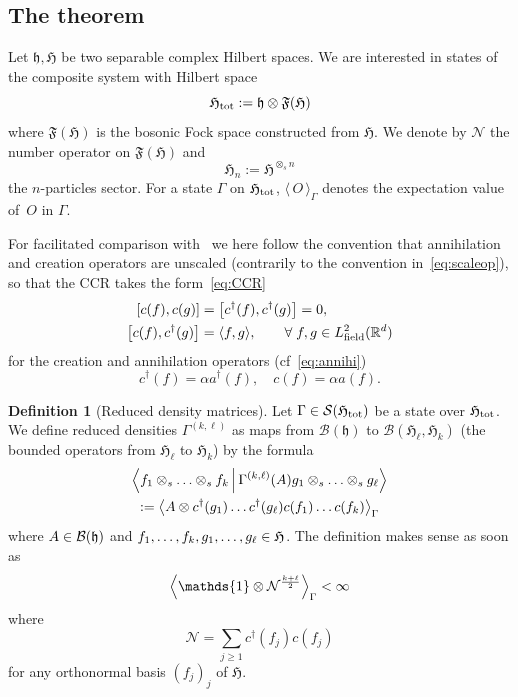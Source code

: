 \documentclass[10pt]{amsart}
\theoremstyle{definition}\newtheorem{defi}[theo]{Definition}\newtheorem{rema}[theo]{Remark}\newtheorem{exam}[theo]{Example}\newtheorem{exem}[theo]{Example}\newtheorem{nota}[theo]{Notation}
\DeclareMathOperator{\field}{field}
\newcommand{\cS}{\mathcal{S}}
\newcommand{\R}{\mathbb{R}}
\newcommand{\cN}{\mathcal{N}}
\newcommand{\gH}{\mathfrak{H}}
\newcommand{\gF}{\mathfrak{F}}
\newcommand{\gh}{\mathfrak{h}}
\newcommand{\cB}{\mathcal{B}}
\newcommand{\1}{\mathds{1}}
\newcommand{\ada}{a^{\dagger}}
\newcommand{\cda}{c^{\dagger}}
\newcommand{\gHt}{\mathfrak{H}_{\rm tot}}
\let\oldin\in
\renewcommand{\in}{\mathchoice{\oldin}{\oldin}{\,\oldin\,}{\,\oldin\,}}
\let\originalleft\left
\let\originalright\right
\renewcommand{\left}{\mathopen{}\mathclose\bgroup\originalleft}
\renewcommand{\right}{\aftergroup\egroup\originalright}
\let\oldforall\forall
\renewcommand*{\forall}{\mathrel{\oldforall}}
\begin{document}
\subsection{The theorem}

Let $\gh,\gH$ be two separable complex Hilbert spaces. We are interested in states of the composite system with Hilbert space
\begin{equation*}
\gHt := \gh \otimes \gF(\gH)
\end{equation*}
where $\gF(\gH)$ is the bosonic Fock space constructed from $\gH$. We denote by $\cN$ the number operator on $\gF(\gH)$ and
\begin{equation*}
\gH_n := \gH^{\otimes_s n}
\end{equation*}
the $n$-particles sector. For a state $\Gamma$ on $\gHt$, $ \langle \, O \, \rangle_{\Gamma} $ denotes the expectation value of~$O$ in $\Gamma$.

For facilitated comparison with~\cite{LewNamRou-14d} we here follow the convention that annihilation and creation operators are unscaled (contrarily to the convention in~\eqref{eq:scaleop}), so that the CCR takes the form~\eqref{eq:CCR}
\begin{equation}\label{eq:CCRagain}
\begin{split}
[c(f),c(g)] &=\left[c^\dagger(f),c^\dagger(g)\right]=0,\\
\left[c(f),c^\dagger(g)\right] &=\langle f,g\rangle, \qquad \forall f,g\in L_{\field}^2(\R^d)
\end{split}
\end{equation}
for the creation and annihilation operators (cf~\eqref{eq:annihi})
\begin{equation*}
c^\dagger (f) = \alpha \ada (f), \quad c(f)= \alpha a(f).
\end{equation*}


\begin{defi}[{Reduced density matrices}]\label{def:sym state}
Let $\Gamma \in \cS (\gHt)$ be a state over $\gHt$. We define reduced densities $\Gamma ^{(k,\ell)}$ as maps from $\cB(\gh)$ to $\cB (\gH_\ell,\gH_k)$ (the bounded operators from $\gH_\ell$ to $\gH_k$) by the formula
\begin{multline}\label{eq:red dens}
\left\langle f_1\otimes_s \ldots \otimes_s f_k \,\middle|\,\Gamma ^{(k,\ell)} (A) g_1\otimes_s \ldots \otimes_s g_\ell\right\rangle\\
:= \left\langle A \otimes \cda (g_1) \ldots \cda (g_\ell) c (f_1) \ldots c(f_k) \right\rangle_\Gamma
\end{multline}
where $A\in \cB (\gh)$ and $f_1,\ldots,f_k,g_1,\ldots,g_\ell \in \gH$. The definition makes sense as soon as
\begin{equation*}
\left\langle \1\otimes \cN ^{\frac{k+\ell}{2}}\right\rangle_\Gamma < \infty
\end{equation*}
where
\begin{equation*}
\cN = \sum_{j\geq 1} \cda (f_j) c(f_j)
\end{equation*}
for any orthonormal basis $(f_j)_j$ of $\gH$.
\end{defi}
\end{document}
